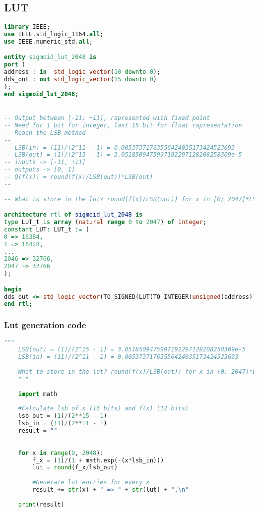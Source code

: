 \subsection{LUT}
\begin{lstlisting}[language=VHDL]
library IEEE;
use IEEE.std_logic_1164.all;
use IEEE.numeric_std.all;

entity sigmoid_lut_2048 is
port (
address : in  std_logic_vector(10 downto 0);
dds_out : out std_logic_vector(15 downto 0) 
);
end sigmoid_lut_2048;


-- Output between [-11; +11], rapresented with fixed point
-- Need for 1 bit for integer, last 15 bit for float rapresentation
-- Reach the LSB method
-- 
-- LSB(in) = (11)/(2^11 - 1) = 0.00537371763556424035173424523693
-- LSB(out) = (1)/(2^15 - 1) = 3.0518509475997192297128208258309e-5
-- inputs -> [-11, +11] 
-- outputs -> [0, 1]
-- Q(f(x)) = round(f(x)/LSB(out))*LSB(out)
-- 
--
-- What to store in the lut? round(f(x)/LSB(out)) for x in [0; 2047]*LSB(in)

architecture rtl of sigmoid_lut_2048 is
type LUT_t is array (natural range 0 to 2047) of integer;
constant LUT: LUT_t := (
0 => 16384,
1 => 16428,
...
2046 => 32766,
2047 => 32766
);

begin
dds_out <= std_logic_vector(TO_SIGNED(LUT(TO_INTEGER(unsigned(address))),16));
end rtl;	
\end{lstlisting}

\subsubsection{Lut generation code}
\begin{lstlisting}[language=Python]
	"""
	LSB(out) = (1)/(2^15 - 1) = 3.0518509475997192297128208258309e-5
	LSB(in) = (11)/(2^11 - 1) = 0.00537371763556424035173424523693
	
	What to store in the lut? round(f(x)/LSB(out)) for x in [0; 2047]*LSB(in)
	"""
	
	import math
	
	#Calculate lsb of x (16 bits) and f(x) (12 bits)
	lsb_out = (1)/(2**15 - 1)
	lsb_in = (11)/(2**11 - 1)
	result = ""
	
	
	for x in range(0, 2048):
		f_x = (1)/(1 + math.exp(-(x*lsb_in)))
		lut = round(f_x/lsb_out)
		
		#Generate lut entries for every x
		result += str(x) + " => " + str(lut) + ",\n"
	
	print(result)
	
\end{lstlisting}